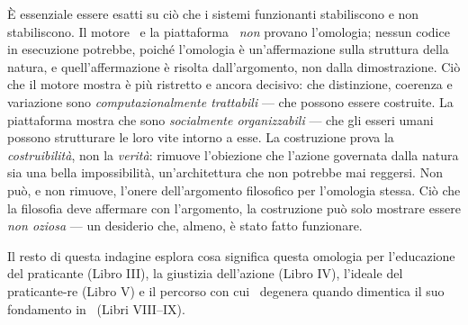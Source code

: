 \`E essenziale essere esatti su ci\`o che i sistemi funzionanti stabiliscono e
non stabiliscono. Il motore \physis\ e la piattaforma \praxis\ \emph{non}
provano l'omologia; nessun codice in esecuzione potrebbe, poich\'e l'omologia
\`e un'affermazione sulla struttura della natura, e quell'affermazione \`e
risolta dall'argomento, non dalla dimostrazione. Ci\`o che il motore mostra \`e
pi\`u ristretto e ancora decisivo: che distinzione, coerenza e variazione sono
\emph{computazionalmente trattabili} --- che possono essere costruite. La
piattaforma mostra che sono \emph{socialmente organizzabili} --- che gli esseri
umani possono strutturare le loro vite intorno a esse. La costruzione prova la
\emph{costruibilit\`a}, non la \emph{verit\`a}: rimuove l'obiezione che l'azione
governata dalla natura sia una bella impossibilit\`a, un'architettura che non
potrebbe mai reggersi. Non pu\`o, e non rimuove, l'onere dell'argomento
filosofico per l'omologia stessa. Ci\`o che la filosofia deve affermare con
l'argomento, la costruzione pu\`o solo mostrare essere \emph{non oziosa} --- un
desiderio che, almeno, \`e stato fatto funzionare.

Il resto di questa indagine esplora cosa significa questa omologia per
l'educazione del praticante (Libro III), la giustizia dell'azione
(Libro IV), l'ideale del praticante-re (Libro V) e il percorso con cui
\praxis\ degenera quando dimentica il suo fondamento in \physis\
(Libri VIII--IX).
